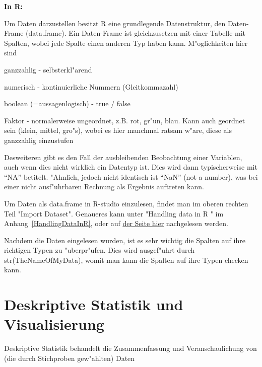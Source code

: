 \documentclass[a4paper,twoside]{tufte-book}\usepackage[]{graphicx}\usepackage[]{color}
\begin{document}
	
	\vspace{1cm}
	\begin{fullwidth}
		\begin{mdframed}
			
			\textbf{In R:} 
			
			Um Daten darzustellen besitzt R eine grundlegende Datenstruktur, den Daten-Frame (data.frame). Ein Daten-Frame ist gleichzusetzen mit einer Tabelle mit Spalten, wobei jede Spalte einen anderen Typ haben kann. M"oglichkeiten hier sind
			
			\begin{itemize*}
				\item ganzzahlig - selbsterkl"arend
				\item numerisch - kontinuierliche Nummern (Gleitkommazahl)
				\item boolean (=aussagenlogisch) - true / false
				\item Faktor - normalerweise ungeordnet, z.B. rot, gr"un, blau. Kann auch geordnet sein (klein, mittel, gro"s), wobei es hier manchmal ratsam w"are, diese als ganzzahlig einzustufen
			\end{itemize*}
			
			Desweiteren gibt es den Fall der ausbleibenden Beobachtung einer Variablen, auch wenn dies nicht wirklich ein Datentyp ist. Dies wird dann typischerweise mit "`NA"' betitelt. "Ahnlich, jedoch nicht identisch ist "`NaN"' (not a number), was bei einer nicht ausf"uhrbaren Rechnung als Ergebnis auftreten kann.
			
			Um Daten als data.frame in R-studio einzulesen, findet man im oberen rechten Teil "Import Dataset". Genaueres kann unter "Handling data in R " im Anhang~\ref{HandlingDataInR}, oder auf \href{http://biometry.github.io/APES/R/R20-DataStructures.html}{der Seite hier} nachgelesen werden.
			
			Nachdem die Daten eingelesen wurden, ist es sehr wichtig die Spalten auf ihre richtigen Typen zu "uberpr"ufen. Dies wird ausgef"uhrt durch str(TheNameOfMyData), womit man kann die Spalten auf ihre Typen checken kann.
			
		\end{mdframed}
	\end{fullwidth}
	
	
	\chapter{Deskriptive Statistik und Visualisierung}
	
	Deskriptive Statistik behandelt die Zusammenfassung und Veranschaulichung von (die durch Stichproben gew"ahlten) Daten
	
\end{document}
